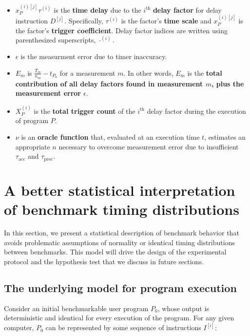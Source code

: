 \documentclass[conference]{IEEEtran}
\begin{document}
\begin{itemize}
    \item
    $x_P^{(i)[j]} \tau^{(i)}$ is the \textbf{time delay} due to the
    $i^{\textrm{th}}$ \textbf{delay factor} for delay instruction $D^{[j]}$.  Specifically,
    $\tau^{(i)}$ is the factor's \textbf{time scale} and $x_P^{(i)[j]}$ is the factor's
    \textbf{trigger coefficient}. Delay factor indices are written using parenthesized
    superscripts, $\cdot^{(i)}$.

    \item
    $\epsilon$ is the measurment error due to timer inaccuracy.

    \item
    $E_m$ is $\frac{T_m}{n_m} - t_{P_0}$ for a measurement $m$. In other words, $E_m$ is the
    \textbf{total contribution of all delay factors found in measurement $m$, plus the
    measurement error $\epsilon$}.

    \item
    $X^{(i)}_P$ is the \textbf{total trigger count} of the $i^{\textrm{th}}$
    delay factor during the execution of program $P$.

    \item
    $\nu$ is an \textbf{oracle function} that, evaluated at an execution time $t$, estimates
    an appropriate $n$ necessary to overcome measurement error due to insufficient
    $\tau_{\textrm{acc}}$ and $\tau_{\textrm{prec}}$.
\end{itemize}

\label{sec:model}
\section{A better statistical interpretation of benchmark timing distributions}

In this section, we present a statistical description of benchmark behavior that avoids
problematic assumptions of normality or identical timing distributions between benchmarks.
This model will drive the design of the experimental protocol and the hypothesis test
that we discuss in future sections.

\subsection{The underlying model for program execution}

Consider an initial benchmarkable user program $P_0$, whose output is deterministic and
identical for every execution of the program. For any given computer, $P_0$ can be
represented by some sequence of instructions $I^{[i]}$:
\end{document}

